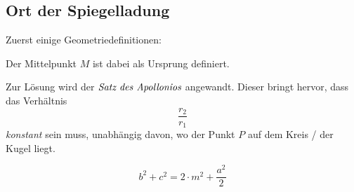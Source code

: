 \documentclass[11pt, a4paper]{article}
\begin{document}
\begin{figure}[H]
\centering
{}
\end{figure}

\subsection{Ort der Spiegelladung}
Zuerst einige Geometriedefinitionen:

\begin{figure}[H]
\centering
{}
\end{figure}

Der Mittelpunkt $M$ ist dabei als Ursprung definiert.

Zur Lösung wird der $\emph{Satz des Apollonios}$ angewandt. Dieser bringt hervor, dass das Verhältnis
\[\frac{r_{2}}{r_{1}}\]
\emph{konstant} sein muss, unabhängig davon, wo der Punkt $P$ auf dem Kreis / der Kugel liegt.

\begin{figure}[H]
\centering
{}
\end{figure}
\[b^{2} + c^{2} = 2 \cdot m^{2} + \frac{a^{2}}{2}\]


\end{document}

